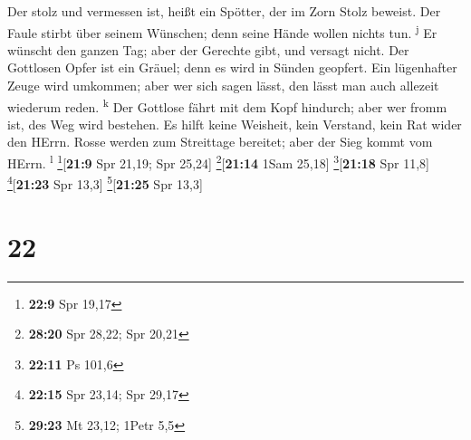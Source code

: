  Der stolz und vermessen ist, heißt ein Spötter, der im
Zorn Stolz beweist.  Der Faule stirbt über seinem
Wünschen; denn seine Hände wollen nichts tun. \textsuperscript{j}
 Er wünscht den ganzen Tag; aber der Gerechte gibt, und
versagt nicht.  Der Gottlosen Opfer ist ein Gräuel; denn
es wird in Sünden geopfert.  Ein lügenhafter Zeuge wird
umkommen; aber wer sich sagen lässt, den lässt man auch allezeit
wiederum reden. \textsuperscript{k}  Der Gottlose fährt
mit dem Kopf hindurch; aber wer fromm ist, des Weg wird bestehen.
 Es hilft keine Weisheit, kein Verstand, kein Rat wider
den HErrn.  Rosse werden zum Streittage bereitet; aber
der Sieg kommt vom HErrn. \textsuperscript{l}
\footnote{\textbf{22:9} Spr 19,17}{[}\textbf{21:9} Spr 21,19; Spr
25,24{]} \footnote{\textbf{28:20} Spr 28,22; Spr 20,21}{[}\textbf{21:14}
1Sam 25,18{]} \footnote{\textbf{22:11} Ps 101,6}{[}\textbf{21:18} Spr
11,8{]} \footnote{\textbf{22:15} Spr 23,14; Spr 29,17}{[}\textbf{21:23}
Spr 13,3{]} \footnote{\textbf{29:23} Mt 23,12; 1Petr 5,5}{[}\textbf{21:25}
Spr 13,3{]}

\hypertarget{section-21}{%
\section{22}\label{section-21}}

